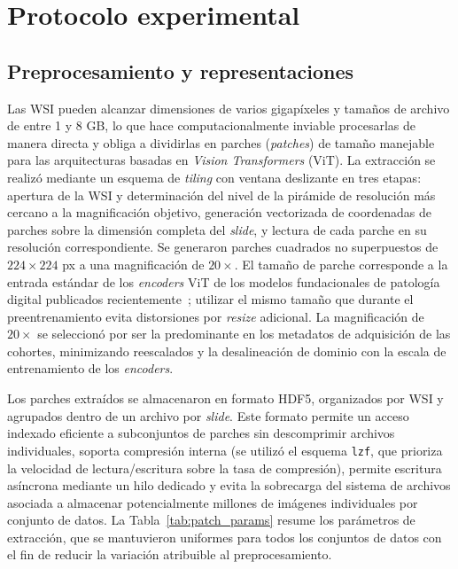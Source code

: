 \section{Protocolo experimental}
\label{sec:protocolo}

\subsection{Preprocesamiento y representaciones}
\label{sec:preprocesamiento_representaciones}
\label{sec:protocolo-inferencia}

Las WSI pueden alcanzar dimensiones de varios gigapíxeles y tamaños de archivo de entre 1 y 8 GB, lo que hace computacionalmente inviable procesarlas de manera directa y obliga a dividirlas en parches (\textit{patches}) de tamaño manejable para las arquitecturas basadas en \textit{Vision Transformers} (ViT). La extracción se realizó mediante un esquema de \textit{tiling} con ventana deslizante en tres etapas: apertura de la WSI y determinación del nivel de la pirámide de resolución más cercano a la magnificación objetivo, generación vectorizada de coordenadas de parches sobre la dimensión completa del \textit{slide}, y lectura de cada parche en su resolución correspondiente. Se generaron parches cuadrados no superpuestos de $224 \times 224$ px a una magnificación de $20\times$. El tamaño de parche corresponde a la entrada estándar de los \textit{encoders} ViT de los modelos fundacionales de patología digital publicados recientemente~\parencite{chen2024uni, filiot2024phikonv2}; utilizar el mismo tamaño que durante el preentrenamiento evita distorsiones por \textit{resize} adicional. La magnificación de $20\times$ se seleccionó por ser la predominante en los metadatos de adquisición de las cohortes, minimizando reescalados y la desalineación de dominio con la escala de entrenamiento de los \textit{encoders}.

Los parches extraídos se almacenaron en formato HDF5, organizados por WSI y agrupados dentro de un archivo por \textit{slide}. Este formato permite un acceso indexado eficiente a subconjuntos de parches sin descomprimir archivos individuales, soporta compresión interna (se utilizó el esquema \texttt{lzf}, que prioriza la velocidad de lectura/escritura sobre la tasa de compresión), permite escritura asíncrona mediante un hilo dedicado y evita la sobrecarga del sistema de archivos asociada a almacenar potencialmente millones de imágenes individuales por conjunto de datos. La Tabla~\ref{tab:patch_params} resume los parámetros de extracción, que se mantuvieron uniformes para todos los conjuntos de datos con el fin de reducir la variación atribuible al preprocesamiento.

